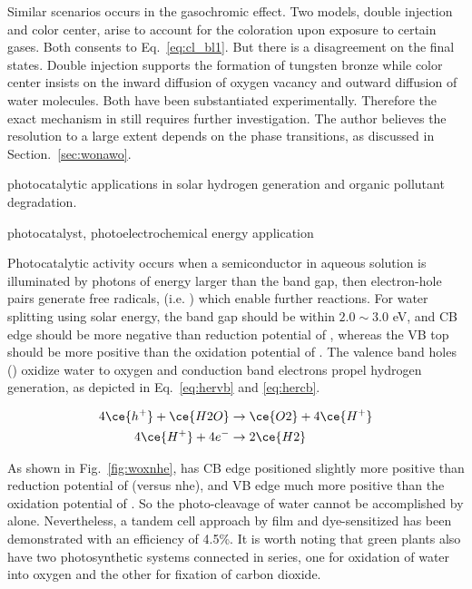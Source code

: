 Similar scenarios occurs in the gasochromic effect. Two models, double injection and color center, arise to account for the coloration upon exposure to certain gases. Both consents to Eq.~\ref{eq:cl_bl1}. But there is a disagreement on the final states. Double injection supports the formation of tungsten bronze  while color center insists on the inward diffusion of oxygen vacancy and outward diffusion of water molecules. Both have been substantiated experimentally. Therefore the exact mechanism in  still requires further investigation. The author believes the resolution to a large extent depends on the phase transitions, as discussed in Section.~\ref{sec:wonawo}.

photocatalytic applications in solar hydrogen generation and organic pollutant degradation.

photocatalyst\cite{Macphee2010}, photoelectrochemical energy application \cite{Su2010}

Photocatalytic activity occurs when a semiconductor in aqueous solution is illuminated by photons of energy larger than the band gap, then electron-hole pairs generate free radicals, (i.e. ) which enable further reactions. For water splitting using solar energy, the band gap should be within $2.0 \sim 3.0 $ eV, and CB edge should be more negative than reduction potential of , whereas the VB top should be more positive than the oxidation potential of .\cite{Wang2012} The valence band holes () oxidize water to oxygen and conduction band electrons propel hydrogen generation, as depicted in Eq.~\ref{eq:hervb} and \ref{eq:hercb}.

\begin{align}
4\ce{h^+} +  \ce{H2O} &\rightarrow \ce{O2} + 4\ce{H^+} \label{eq:hervb}\\
4\ce{H^+} +  4e^- &\rightarrow 2\ce{H2} \label{eq:hercb}
\end{align}

As shown in Fig.~\ref{fig:woxnhe},  has CB edge positioned slightly more positive than reduction potential of (versus \gls{nhe}), and VB edge much more positive than the oxidation potential of . So the photo-cleavage of water cannot be accomplished by  alone. Nevertheless, a tandem cell approach by  film and dye-sensitized  has been demonstrated with an efficiency of 4.5\%.\cite{Michael1999} It is worth noting that green plants also have two photosynthetic systems connected in series, one for oxidation of water into oxygen and the other for fixation of carbon dioxide.

